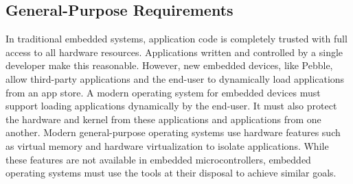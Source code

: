 

\subsection{General-Purpose Requirements}

In traditional embedded systems, application code is completely trusted with
full access to all hardware resources.
Applications written and controlled by a single developer make this reasonable.
However, new embedded devices, like Pebble,
allow third-party applications and the end-user to dynamically load
applications from an app store.
A modern operating system for embedded devices must support loading applications
dynamically by the end-user. It must also protect the hardware and
kernel from these applications and applications from one another.
Modern general-purpose operating systems use hardware features such as
virtual memory and hardware virtualization to isolate applications. While these
features are not available in embedded microcontrollers, embedded operating
systems must use the tools at their disposal to achieve similar goals.

